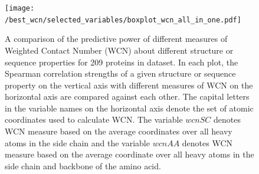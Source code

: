 \documentclass[11pt]{article}
\begin{document}



    \begin{figure}[tbh]
        \begin{center}
        \texttt{[image: /best\_wcn/selected\_variables/boxplot\_wcn\_all\_in\_one.pdf]}
        \end{center}
        \caption{A comparison of the predictive power of different measures of Weighted Contact Number (WCN) about different structure or sequence properties for 209 proteins in dataset. In each plot, the Spearman correlation strengths of a given structure or sequence property on the vertical axis with different measures of WCN on the horizontal axis are compared against each other. The capital letters in the variable names on the horizontal axis denote the set of atomic coordinates used to calculate WCN. The variable $wcnSC$ denotes WCN measure based on the average coordinates over all heavy atoms in the side chain and the variable $wcnAA$ denotes WCN measure based on the average coordinate over all heavy atoms in the side chain and backbone of the amino acid.}
        \label{fig:best_wcn}
    \end{figure}
\end{document}
